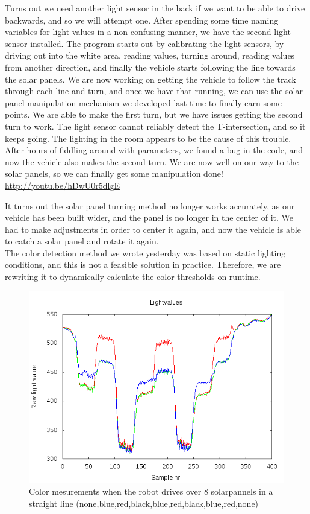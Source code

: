 Turns out we need another light sensor in the back if we want to be able
to drive backwards, and so we will attempt one.
After spending some time
naming variables for light values in a non-confusing manner, we have the second light sensor
installed. The program starts out by calibrating the light sensors, by
driving out into the white area, reading values, turning around, reading
values from another direction, and finally the vehicle starts following
the line towards the solar panels.
We are now working on getting the
vehicle to follow the track through each line and turn, and once we have
that running, we can use the solar panel manipulation mechanism we
developed last time to finally earn some points.
We are able to make the
first turn, but we have issues getting the second turn to work. The
light sensor cannot reliably detect the T-intersection, and so it keeps going.
The lighting in the room appears to be the cause of this trouble.
After
hours of fiddling around with parameters, we found a bug in the code,
and now the vehicle also makes the second turn. We are now well on our
way to the solar panels, so we can finally get some manipulation done!
\url{http://youtu.be/hDwU0r5dlgE}

It turns out the solar panel turning method no longer works accurately, as
our vehicle has been built wider, and the panel is no longer in the
center of it. We had to make adjustments in order to center it again,
and now the vehicle is able to catch a solar panel and rotate it
again.\\The color detection method we wrote yesterday was based on
static lighting conditions, and this is not a feasible solution in
practice. Therefore, we are rewriting it to dynamically calculate the
color thresholds on
runtime.

\begin{figure}[hbt]
  \centering
  \includegraphics[scale=0.5]{../experiments/2prototype/results/gnuplot/Colormesrun1.png}
  \caption{Color mesurements when the robot drives over 8 solarpannels in a straight line (none,blue,red,black,blue,red,black,blue,red,none)}
\end{figure}

